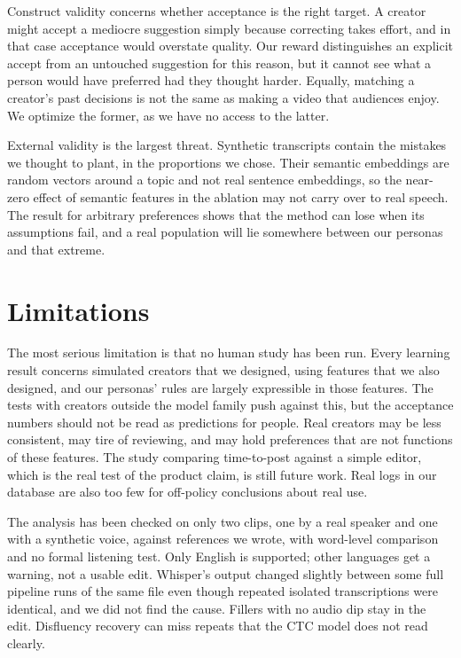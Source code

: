 \documentclass{ieeeaccess}
\begin{document}
Construct validity concerns whether acceptance is the right target. A creator might accept a mediocre suggestion simply because correcting takes effort, and in that case acceptance would overstate quality. Our reward distinguishes an explicit accept from an untouched suggestion for this reason, but it cannot see what a person would have preferred had they thought harder. Equally, matching a creator's past decisions is not the same as making a video that audiences enjoy. We optimize the former, as we have no access to the latter.

External validity is the largest threat. Synthetic transcripts contain the mistakes we thought to plant, in the proportions we chose. Their semantic embeddings are random vectors around a topic and not real sentence embeddings, so the near-zero effect of semantic features in the ablation may not carry over to real speech. The result for arbitrary preferences shows that the method can lose when its assumptions fail, and a real population will lie somewhere between our personas and that extreme.

\section{Limitations}
\label{sec:limitations}
The most serious limitation is that no human study has been run. Every learning result concerns simulated creators that we designed, using features that we also designed, and our personas' rules are largely expressible in those features. The tests with creators outside the model family push against this, but the acceptance numbers should not be read as predictions for people. Real creators may be less consistent, may tire of reviewing, and may hold preferences that are not functions of these features. The study comparing time-to-post against a simple editor, which is the real test of the product claim, is still future work. Real logs in our database are also too few for off-policy conclusions about real use.

The analysis has been checked on only two clips, one by a real speaker and one with a synthetic voice, against references we wrote, with word-level comparison and no formal listening test. Only English is supported; other languages get a warning, not a usable edit. Whisper's output changed slightly between some full pipeline runs of the same file even though repeated isolated transcriptions were identical, and we did not find the cause. Fillers with no audio dip stay in the edit. Disfluency recovery can miss repeats that the CTC model does not read clearly.
\end{document}
